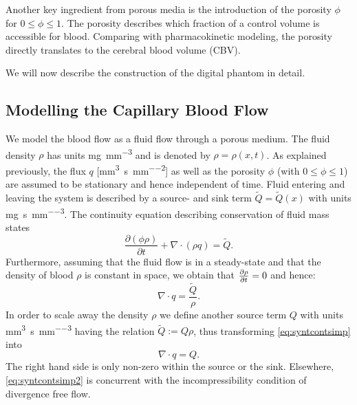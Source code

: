 \documentclass[paper=a4, fontsize=11pt,parskip=half,headings=small]{scrartcl}
\newcommand{\siq}{\milli\meter\cubed\per\second\per\milli\meter\squared}
\newcommand{\siQtilde}{\milli\gram\per\second\per\milli\meter\cubed}
\newcommand{\siQ}{\milli\meter\cubed\per\second\per\milli\meter\cubed}
\newcommand{\sirho}{\milli\gram\per\milli\meter\cubed}
\begin{document}
	Another key ingredient from porous media is the introduction of the porosity $\phi$ for $0 \le \phi \le 1$.
	The porosity describes which fraction of a control volume is accessible for blood.
	Comparing with pharmacokinetic modeling, the porosity directly translates to the cerebral blood volume (CBV).
	
	We will now describe the construction of the digital phantom in detail.	
	
	\subsection{Modelling the Capillary Blood Flow}\label{sec:flow}
	
	We model the blood flow as a fluid flow through a porous medium. 
	The fluid density $\rho$ has units \si{\sirho} and is denoted by $\rho = \rho(x,t)$.
	As explained previously, the flux $q$ [\si{\siq}] as well as the porosity $\phi$ (with $0 \le \phi \le 1$) are assumed to be stationary and hence independent of time.
	Fluid entering and leaving the system is described by a source- and sink term $\tilde{Q} = \tilde{Q}(x)$ with units \si{\siQtilde}. 
	The continuity equation describing conservation of fluid mass states
	\begin{equation}
		\frac{\partial (\phi \rho)}{\partial t} + \nabla \cdot (\rho q) = \tilde{Q}.
		\label{eq:syntcont}
	\end{equation} 
	Furthermore, assuming that the fluid flow is in a steady-state and that the density of blood $\rho$ is constant in space, we obtain that $\frac{\partial \rho}{\partial t} = 0$ and hence:
	\begin{equation}
		\nabla \cdot q = \frac{\tilde{Q}}{\rho}.
		\label{eq:syntcontsimp}
	\end{equation}
	In order to scale away the density $\rho$ we define another source term $Q$ with units \si{\siQ} having the relation $\tilde{Q} := Q\rho$, thus transforming \eqref{eq:syntcontsimp} into
	\begin{equation}
		\nabla \cdot q = Q.
		\label{eq:syntcontsimp2}
	\end{equation}
	The right hand side is only non-zero within the source or the sink. 
	Elsewhere, \eqref{eq:syntcontsimp2} is concurrent with the incompressibility condition of divergence free flow.
	
\end{document}
